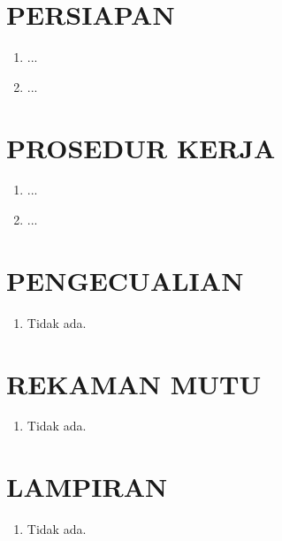 \documentclass[12pt]{soi}
\begin{document}
    \section{PERSIAPAN}
    \begin{enumerate}
        \item ...
        \item ...
    \end{enumerate}

    \section{PROSEDUR KERJA}
    \begin{enumerate}
        \item ...
        \item ...
    \end{enumerate}

    \section{PENGECUALIAN}
    \begin{enumerate}
        \item Tidak ada.
    \end{enumerate}

    \section{REKAMAN MUTU}
    \begin{enumerate}
        \item Tidak ada.
    \end{enumerate}

    \section{LAMPIRAN}
    \begin{enumerate}
        \item Tidak ada.
    \end{enumerate}
\end{document}
